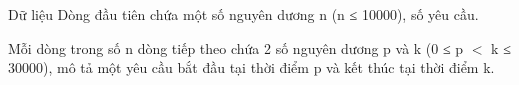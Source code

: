 Dữ liệu
Dòng đầu tiên chứa một số nguyên dương n (n ≤ 10000), số yêu cầu.  

   Mỗi dòng trong số n dòng tiếp theo chứa 2 số nguyên dương p và k (0 ≤ p $<$ k ≤ 30000), mô tả một yêu cầu bắt đầu tại thời điểm p và kết thúc tại thời điểm k.